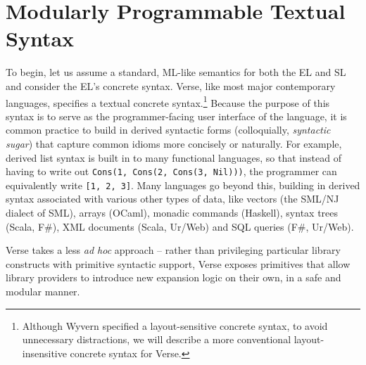 \section{Modularly Programmable Textual Syntax}\label{sec:syntax}
To begin, let us assume a standard, ML-like semantics for both the EL and SL and consider the EL's concrete syntax. Verse, like most major contemporary languages, specifies a textual concrete syntax.\footnote{Although Wyvern specified a layout-sensitive concrete syntax, to avoid unnecessary distractions, we will describe a more conventional layout-insensitive concrete syntax for Verse.} %
Because the purpose of this syntax is to serve as the programmer-facing user interface of the language, it is common practice to build in  derived syntactic forms (colloquially, \emph{syntactic sugar}) that capture common idioms more concisely or naturally. %
For example, derived list syntax is built in to many functional languages, so that instead of having to write out \lstinline{Cons(1, Cons(2, Cons(3, Nil)))}, the programmer can equivalently write \lstinline{[1, 2, 3]}. Many languages go beyond this, building in derived syntax associated with various other types of data, like vectors (the SML/NJ dialect of SML), arrays (OCaml), monadic commands (Haskell), syntax trees (Scala, F\#), XML documents (Scala, Ur/Web) and SQL queries (F\#, Ur/Web). %

Verse takes a less \emph{ad hoc} approach -- rather than privileging  particular library constructs with primitive syntactic support, Verse exposes primitives that allow library providers to introduce new expansion logic on their own, in a safe and modular manner. %

